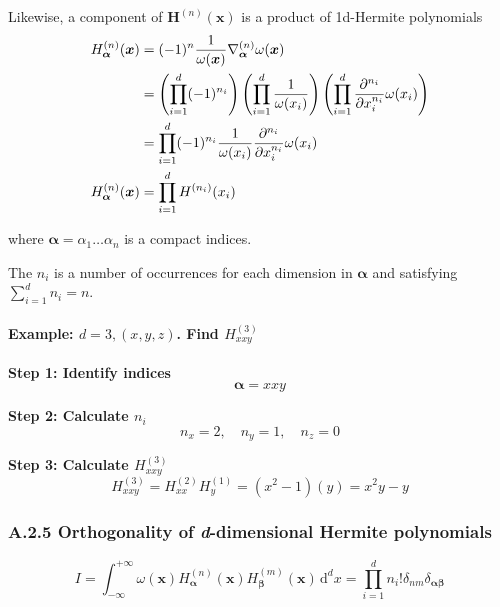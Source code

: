 \documentclass[draft]{article}
\begin{document}
\vspace*{0.5cm}
Likewise, a component of $\bm{H}^{(n)} (\bm{x})$ is a product of 1d-Hermite polynomials
\begin{align}
	H^{(n)}_{\bm{\alpha}}(\bm{x}) &= (-1)^{n} \frac{1}{\omega (\bm{x})} \nabla^{(n)}_{\bm{\alpha}} \omega{(\bm{x})} \notag \\ 
											  &= \left ( \prod_{i=1}^{d} (-1)^{n_i} \right ) \left ( \prod_{i=1}^{d} \frac{1}{\omega(x_i)} \right ) \left ( \prod_{i=1}^{d} \frac{\partial^{n_i}}{\partial x_i^{n_i}} \omega(x_i) \right ) \notag \\
										      &= \prod_{i=1}^{d} (-1)^{n_i} \frac{1}{\omega(x_i)} \frac{\partial^{n_i}}{\partial x_i^{n_i}} \omega(x_i) \notag \\
	H^{(n)}_{\bm{\alpha}}(\bm{x}) &= \prod_{i=1}^{d} H^{(n_i)} (x_i)
\end{align}

where $\bm{\alpha} = \alpha_1 \dots \alpha_n$ is a compact indices.

The $n_i$ is a number of occurrences for each dimension in $\bm{\alpha}$ and satisfying $\sum_{i=1}^{d} n_i = n$.

\clearpage

\paragraph*{Example: \textnormal{$d = 3, (x, y, z)$. Find $H^{(3)}_{xxy}$}}

\vphantom{}
\vspace*{0.5cm}

\textbf{Step 1: Identify indices}
$$
\bm{\alpha} = xxy
$$

\textbf{Step 2: Calculate $n_i$}
$$
n_x = 2, \quad n_y = 1, \quad n_z = 0
$$

\textbf{Step 3: Calculate $H^{(3)}_{xxy}$}
$$
H^{(3)}_{xxy} = H^{(2)}_{xx} H^{(1)}_{y} = (x^2-1)(y) = x^2y-y
$$

\vspace*{0.5cm}
\subsubsection*{\large A.2.5 Orthogonality of \textit{d}-dimensional Hermite polynomials}
\begin{equation}
	I = \int_{-\infty}^{+\infty} \omega(\bm{x}) H^{(n)}_{\bm{\alpha}}(\bm{x}) H^{(m)}_{\bm{\beta}}(\bm{x}) \, \text{d}^d x = \prod_{i=1}^{d} n_i! \delta_{nm} \delta_{\bm{\alpha} \bm{\beta}} \label{product_hermite}
\end{equation}
\end{document}
